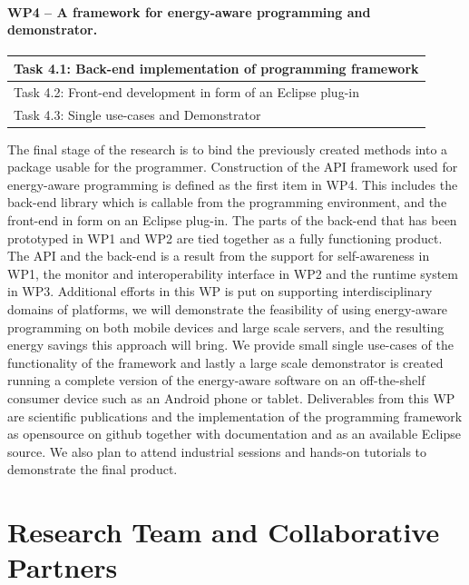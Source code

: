 \documentclass{article}
\begin{document}
\paragraph{WP4 -- A framework for energy-aware programming and demonstrator.}
\begin{table}
\vspace{-0.4cm}
\small
\begin{tabular}{ | l |}
\hline
Task 4.1: Back-end implementation of programming framework\\ \hline
Task 4.2: Front-end development in form of an Eclipse plug-in \\ \hline
Task 4.3: Single use-cases and Demonstrator\\ \hline
\end{tabular}
\vspace{-0.3cm}
\end{table}
The final stage of the research is to bind the previously created methods into a package usable for the programmer.
Construction of the API framework used for energy-aware programming is defined as the first item in WP4.
This includes the back-end library which is callable from the programming environment, and the front-end in form on an Eclipse plug-in.
The parts of the back-end that has been prototyped in WP1 and WP2 are tied together as a fully functioning product.
The API and the back-end is a result from the support for self-awareness in WP1, the monitor and interoperability interface in WP2 and the runtime system in WP3.
Additional efforts in this WP is put on supporting interdisciplinary domains of platforms, we will demonstrate the feasibility of using energy-aware programming on both mobile devices and large scale servers,
and the resulting energy savings this approach will bring.
We provide small single use-cases of the functionality of the framework and lastly a large scale demonstrator is created running a complete version of the energy-aware software on an off-the-shelf consumer device such as an Android phone or tablet.
Deliverables from this WP are scientific publications and the implementation of the programming framework as opensource on github together with documentation and as an available Eclipse source.
We also plan to attend industrial sessions and hands-on tutorials to demonstrate the final product.

\section{Research Team and Collaborative Partners}
\end{document}
